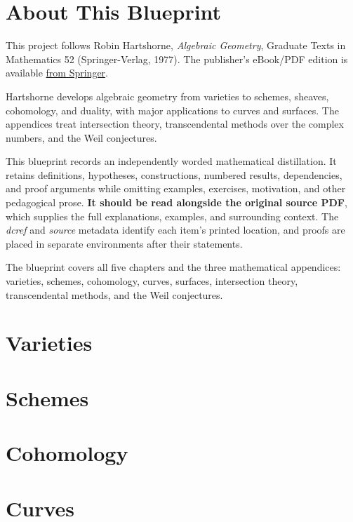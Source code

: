 

\chapter*{About This Blueprint}

This project follows Robin Hartshorne, \emph{Algebraic Geometry}, Graduate
Texts in Mathematics 52 (Springer-Verlag, 1977). The publisher's eBook/PDF
edition is available
\href{https://link.springer.com/content/pdf/10.1007/978-1-4757-3849-0.pdf}{from Springer}.

Hartshorne develops algebraic geometry from varieties to schemes, sheaves,
cohomology, and duality, with major applications to curves and surfaces. The
appendices treat intersection theory, transcendental methods over the complex
numbers, and the Weil conjectures.

This blueprint records an independently worded mathematical distillation. It retains definitions,
hypotheses, constructions, numbered results, dependencies, and proof arguments
while omitting examples, exercises, motivation, and other pedagogical prose.
\textbf{It should be read alongside the original source PDF}, which supplies
the full explanations, examples, and surrounding context. The \emph{dcref}
and \emph{source} metadata identify each item's printed location, and proofs
are placed in separate environments after their statements.

The blueprint covers all five chapters and the three mathematical appendices:
varieties, schemes, cohomology, curves, surfaces, intersection theory,
transcendental methods, and the Weil conjectures.

\chapter{Varieties}
\label{chap:hartshorne-varieties}

\chapter{Schemes}
\label{chap:hartshorne-schemes}

\chapter{Cohomology}
\label{chap:hartshorne-cohomology}

\chapter{Curves}
\label{chap:hartshorne-curves}

